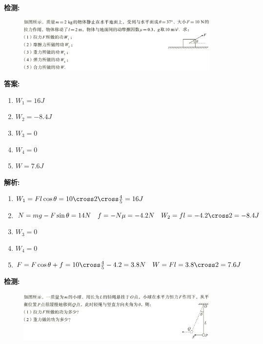 \documentclass{article}
\begin{document}
\begin{itemize}
\begin{enumerate}
                  \vspace{1em}

                  \textbf{检测:}
                  \begin{figure}[h]
                      \centering
                      \includegraphics[width=0.9\textwidth]{pictures/1.png}
                  \end{figure}

                  \vspace{1em}

                  \textbf{答案:}
                  \begin{enumerate}[label=(\arabic*)]
                      \item $W_{1} = 16 J$
                      \item $W_{2} = -8.4J$
                      \item $W_{3} = 0$
                      \item $W_{4} = 0$
                      \item $W = 7.6J$
                  \end{enumerate}

                  \textbf{解析:}
                  \begin{enumerate}[label=(\arabic*)]
                      \item $W_{1} = Fl\cos{\theta} = 10 \cross 2 \cross \frac{4}{5} = 16 J$
                      \item $N = mg - F\sin{\theta} = 14 N \quad f = - N \mu = -4.2N \quad W_{2} = fl = -4.2 \cross 2 = -8.4J$
                      \item $W_{3} = 0$
                      \item $W_{4} = 0$
                      \item $F = F\cos{\theta} + f = 10 \cross \frac{4}{5} - 4.2 = 3.8N \quad W = Fl = 3.8 \cross 2 = 7.6J$
                  \end{enumerate}

                  \vspace{2em}

                  \textbf{检测:}
                  \begin{figure}[h]
                      \centering
                      \includegraphics[width=0.9\textwidth]{pictures/2.png}
                  \end{figure}


\end{enumerate}
\end{itemize}
\end{document}
